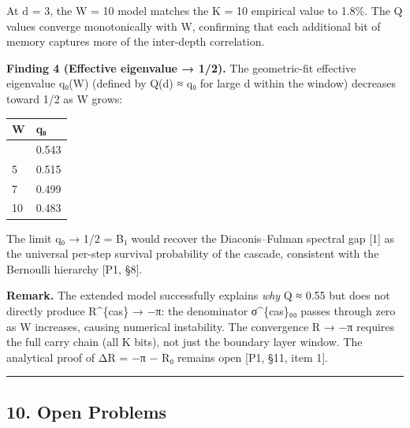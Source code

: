 \documentclass[
  11pt,
]{article}
\begin{document}
At d = 3, the W = 10 model matches the K = 10 empirical value to 1.8\%. The Q
values converge monotonically with W, confirming that each additional bit of
memory captures more of the inter-depth correlation.

\textbf{Finding 4 (Effective eigenvalue → 1/2).} The geometric-fit effective
eigenvalue q₀(W) (defined by Q(d) ≈ q₀ for large d within the window) decreases
toward 1/2 as W grows:

\begin{longtable}[]{@{}ll@{}}
\toprule\noalign{}
W & q₀ \\
\midrule\noalign{}
\endhead
\bottomrule\noalign{}
\endlastfoot
3 & 0.543 \\
5 & 0.515 \\
7 & 0.499 \\
10 & 0.483 \\
\end{longtable}

The limit q₀ → 1/2 = \textbar B₁\textbar{} would recover the Diaconis--Fulman
spectral gap {[}1{]} as the universal per-step survival probability of the
cascade, consistent with the Bernoulli hierarchy {[}P1, §8{]}.

\textbf{Remark.} The extended model successfully explains \emph{why} Q ≈ 0.55
but does not directly produce R\^{}\{cas\} → −π: the denominator σ\^{}\{cas\}₀₀
passes through zero as W increases, causing numerical instability. The
convergence R → −π requires the full carry chain (all K bits), not just the
boundary layer window. The analytical proof of ΔR = −π − R₀ remains open {[}P1,
§11, item 1{]}.

\begin{center}\rule{0.5\linewidth}{0.5pt}\end{center}

\newpage

\subsection{10. Open Problems}\label{open-problems}
\end{document}
